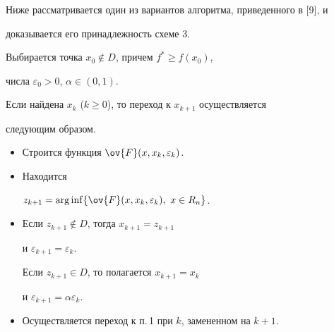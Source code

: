 \medskip





Ниже рассматривается один из вариантов алгоритма, приведенного в [9], и 


доказывается его принадлежность схеме 3.





\begin{alg}


Выбирается точка $x_0\notin D$, причем $f^*\ge f(x_0)$,


числа $\varepsilon_0>0$, $\alpha\in (0,1)$.


Если найдена $x_k$ ($k\ge0$), то переход к $x_{k+1}$ осуществляется


следующим образом.


\begin{itemize}


\item[1.] Строится функция $\ov{F}(x,x_k,\varepsilon_k)$.


\item[2.] Находится


$z_{k+1}=\arginf\{\ov{F}(x,x_k,\varepsilon_k),\ x\in R_n\}$.


\item[3.] Если $z_{k+1}\notin D$, тогда $x_{k+1}=z_{k+1}$


и $\varepsilon_{k+1}=\varepsilon_k$.


Если $z_{k+1}\in D$, то полагается $x_{k+1}=x_k$


и $\varepsilon_{k+1}=\alpha\varepsilon_k$.


\item[4.] Осуществляется переход к п.\,1 при $k$, замененном на $k+1$.


\end{itemize}


\end{alg}





